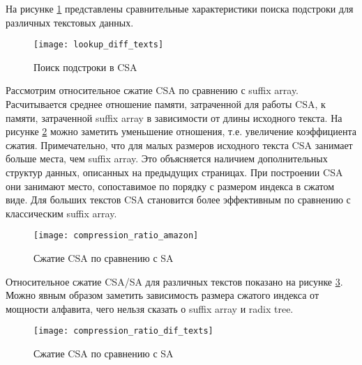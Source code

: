 На рисунке \ref{fig:CSA_Lookup_diff_texts} представлены сравнительные характеристики поиска
подстроки для различных текстовых данных.

\begin{figure}[h!]
    \centering
    \texttt{[image: lookup\_diff\_texts]}
    \caption{Поиск подстроки в CSA}
    \label{fig:CSA_Lookup_diff_texts}
\end{figure}

Рассмотрим относительное сжатие CSA по сравнению с suffix array. Расчитывается среднее отношение памяти,
затраченной для работы CSA, к памяти, затраченной suffix array в зависимости от длины исходного текста.
На рисунке \ref{fig:CSA_compression_ratio_amazon} можно заметить уменьшение отношения, т.е. увеличение
коэффициента сжатия. Примечательно, что для малых размеров исходного текста CSA занимает больше места,
чем suffix array. Это объясняется наличием дополнительных структур данных, описанных на предыдущих страницах.
При построении CSA они занимают место, сопоставимое по порядку с размером индекса в сжатом виде.
Для больших текстов CSA становится более эффективным по сравнению с классическим suffix array.

\begin{figure}[h!]
    \centering
    \texttt{[image: compression\_ratio\_amazon]}
    \caption{Сжатие CSA по сравнению с SA}
    \label{fig:CSA_compression_ratio_amazon}
\end{figure}

\clearpage
Относительное сжатие CSA/SA для различных текстов показано на рисунке \ref{fig:CSA_compression_ratio_dif_texts}.
Можно явным образом заметить зависимость размера сжатого индекса от мощности алфавита, чего нельзя
сказать о suffix array и radix tree.

\begin{figure}[h!]
    \centering
    \texttt{[image: compression\_ratio\_dif\_texts]}
    \caption{Сжатие CSA по сравнению с SA}
    \label{fig:CSA_compression_ratio_dif_texts}
\end{figure}